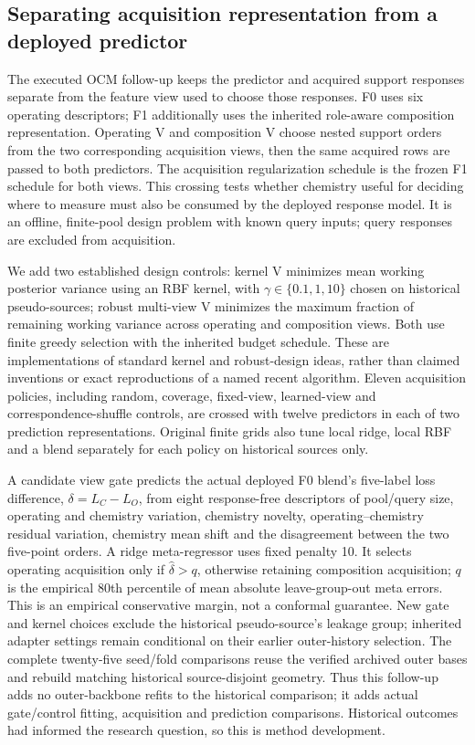 \subsection{Separating acquisition representation from a deployed predictor}
The executed OCM follow-up keeps the predictor and acquired support responses separate from the feature view used to choose those responses. F0 uses six operating descriptors; F1 additionally uses the inherited role-aware composition representation. Operating V and composition V choose nested support orders from the two corresponding acquisition views, then the same acquired rows are passed to both predictors. The acquisition regularization schedule is the frozen F1 schedule for both views. This crossing tests whether chemistry useful for deciding where to measure must also be consumed by the deployed response model. It is an offline, finite-pool design problem with known query inputs; query responses are excluded from acquisition.

We add two established design controls: kernel V minimizes mean working posterior variance using an RBF kernel, with $\gamma\in\{0.1,1,10\}$ chosen on historical pseudo-sources; robust multi-view V minimizes the maximum fraction of remaining working variance across operating and composition views. Both use finite greedy selection with the inherited budget schedule. These are implementations of standard kernel and robust-design ideas, rather than claimed inventions or exact reproductions of a named recent algorithm. Eleven acquisition policies, including random, coverage, fixed-view, learned-view and correspondence-shuffle controls, are crossed with twelve predictors in each of two prediction representations. Original finite grids also tune local ridge, local RBF and a blend separately for each policy on historical sources only.

A candidate view gate predicts the actual deployed F0 blend's five-label loss difference, $\delta=L_C-L_O$, from eight response-free descriptors of pool/query size, operating and chemistry variation, chemistry novelty, operating--chemistry residual variation, chemistry mean shift and the disagreement between the two five-point orders. A ridge meta-regressor uses fixed penalty 10. It selects operating acquisition only if $\widehat\delta>q$, otherwise retaining composition acquisition; $q$ is the empirical 80th percentile of mean absolute leave-group-out meta errors. This is an empirical conservative margin, not a conformal guarantee. New gate and kernel choices exclude the historical pseudo-source's leakage group; inherited adapter settings remain conditional on their earlier outer-history selection. The complete twenty-five seed/fold comparisons reuse the verified archived outer bases and rebuild matching historical source-disjoint geometry. Thus this follow-up adds no outer-backbone refits to the historical comparison; it adds actual gate/control fitting, acquisition and prediction comparisons. Historical outcomes had informed the research question, so this is method development.

